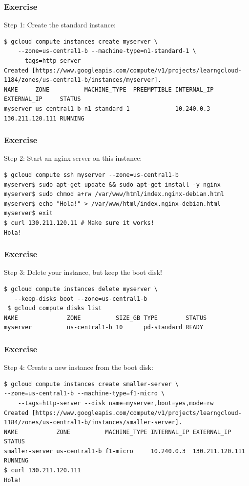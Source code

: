 \documentclass[9pt]{beamer}
\begin{document}
\begin{frame}[fragile]
\frametitle{Exercise}
Step 1: Create the standard instance:
\begin{verbatim}
$ gcloud compute instances create myserver \
    --zone=us-central1-b --machine-type=n1-standard-1 \
    --tags=http-server
Created [https://www.googleapis.com/compute/v1/projects/learngcloud-1184/zones/us-central1-b/instances/myserver].
NAME     ZONE          MACHINE_TYPE  PREEMPTIBLE INTERNAL_IP EXTERNAL_IP     STATUS
myserver us-central1-b n1-standard-1             10.240.0.3  130.211.120.111 RUNNING
\end{verbatim}
\end{frame}

\begin{frame}[fragile]
\frametitle{Exercise}
Step 2: Start an nginx-server on this instance:
\begin{verbatim}
$ gcloud compute ssh myserver --zone=us-central1-b
myserver$ sudo apt-get update && sudo apt-get install -y nginx
myserver$ sudo chmod a+rw /var/www/html/index.nginx-debian.html
myserver$ echo "Hola!" > /var/www/html/index.nginx-debian.html
myserver$ exit
$ curl 130.211.120.11 # Make sure it works!
Hola!
\end{verbatim}
\end{frame}

\begin{frame}[fragile]
\frametitle{Exercise}
Step 3: Delete your instance, but keep the boot disk!
\begin{verbatim}
$ gcloud compute instances delete myserver \
   --keep-disks boot --zone=us-central1-b
 $ gcloud compute disks list
NAME              ZONE          SIZE_GB TYPE        STATUS
myserver          us-central1-b 10      pd-standard READY
\end{verbatim}

\end{frame}

\begin{frame}[fragile]
\frametitle{Exercise}
Step 4: Create a new instance from the boot disk:
\begin{verbatim}
$ gcloud compute instances create smaller-server \
--zone=us-central1-b --machine-type=f1-micro \
    --tags=http-server --disk name=myserver,boot=yes,mode=rw
Created [https://www.googleapis.com/compute/v1/projects/learngcloud-1184/zones/us-central1-b/instances/smaller-server].
NAME           ZONE          MACHINE_TYPE INTERNAL_IP EXTERNAL_IP     STATUS
smaller-server us-central1-b f1-micro     10.240.0.3  130.211.120.111 RUNNING
$ curl 130.211.120.111
Hola!
\end{verbatim}
\end{frame}
\end{document}
